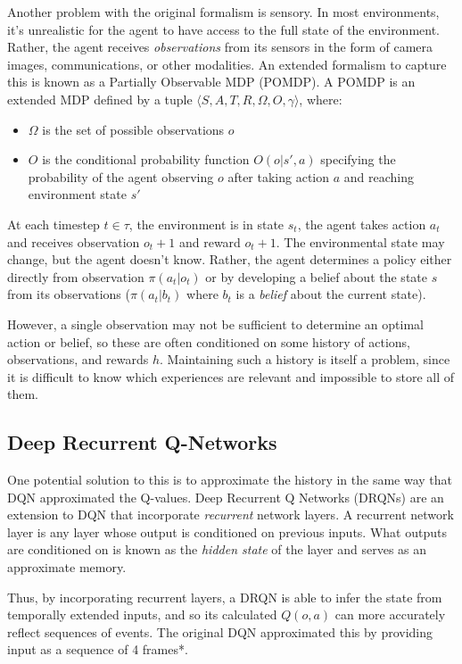 \documentclass[letterpaper]{article}
\begin{document}
 	Another problem with the original formalism is sensory. In most environments, it's unrealistic for the agent to have access to the full state of the environment. Rather, the agent receives \textit{observations} from its sensors in the form of camera images, communications, or other modalities. An extended formalism to capture this is known as a Partially Observable MDP (POMDP). A POMDP is an extended MDP defined by a tuple $\langle S, A, T, R, \Omega, O, \gamma \rangle$, where:
 	\begin{itemize}
 		\item $\Omega$ is the set of possible observations $o$
 		\item $O$ is the conditional probability function $O(o|s',a)$ specifying the probability of the agent observing $o$ after taking action $a$ and reaching environment state $s'$
 	\end{itemize}
 
 	At each timestep $t\in \tau$, the environment is in state $s_t$, the agent takes action $a_t$ and receives observation $o_t+1$ and reward $o_t+1$. The environmental state may change, but the agent doesn't know. Rather, the agent determines a policy either directly from observation $\pi(a_t|o_t)$ or by developing a belief about the state $s$ from its observations ($\pi(a_t|b_t)$ where $b_t$ is a \textit{belief} about the current state). 
 	
 	However, a single observation may not be sufficient to determine an optimal action or belief, so these are often conditioned on some history of actions, observations, and rewards $h$. Maintaining such a history is itself a problem, since it is difficult to know which experiences are relevant and impossible to store all of them.
 	
 	\subsection{Deep Recurrent Q-Networks}
 	
 	One potential solution to this is to approximate the history in the same way that DQN approximated the Q-values. Deep Recurrent Q Networks (DRQNs) are an extension to DQN that incorporate \textit{recurrent} network layers\cite{hausknecht2015deep}. A recurrent network layer is any layer whose output is conditioned on previous inputs. What outputs are conditioned on is known as the \textit{hidden state} of the layer and serves as an approximate memory.
 	
 	Thus, by incorporating recurrent layers, a DRQN is able to infer the state from temporally extended inputs, and so its calculated $Q(o,a)$ can more accurately reflect sequences of events. The original DQN approximated this by providing input as a sequence of 4 frames*.
 	
\end{document}
